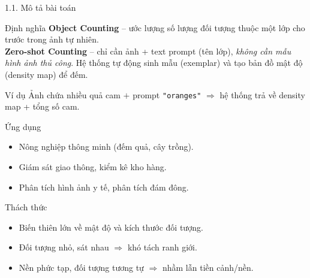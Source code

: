 \documentclass[11pt]{beamer}
\begin{document}
\begin{frame}{1.1. Mô tả bài toán}
\scriptsize

\begin{block}{Định nghĩa}
\textbf{Object Counting} -- ước lượng số lượng đối tượng thuộc một lớp cho trước trong ảnh tự nhiên.\\[0.3em]
\textbf{Zero-shot Counting} -- chỉ cần ảnh + text prompt (tên lớp), \emph{không cần mẫu hình ảnh thủ công}. Hệ thống tự động sinh mẫu (exemplar) và tạo bản đồ mật độ (density map) để đếm.
\end{block}

\begin{block}{Ví dụ}
Ảnh chứa nhiều quả cam $+$ prompt \texttt{"oranges"} $\Rightarrow$ hệ thống trả về density map + tổng số cam.
\end{block}

\begin{block}{Ứng dụng}
\begin{itemize}
  \item Nông nghiệp thông minh (đếm quả, cây trồng).
  \item Giám sát giao thông, kiểm kê kho hàng.
  \item Phân tích hình ảnh y tế, phân tích đám đông.
\end{itemize}
\end{block}

\begin{block}{Thách thức}
\begin{itemize}
  \item Biến thiên lớn về mật độ và kích thước đối tượng.
  \item Đối tượng nhỏ, sát nhau $\Rightarrow$ khó tách ranh giới.
  \item Nền phức tạp, đối tượng tương tự $\Rightarrow$ nhầm lẫn tiền cảnh/nền.
\end{itemize}
\end{block}

\end{frame}
\end{document}
